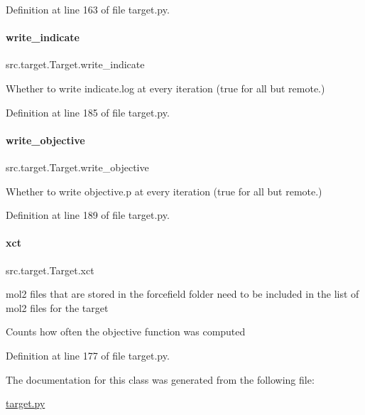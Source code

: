 Definition at line 163 of file target.\+py.

\mbox{\label{classsrc_1_1target_1_1Target_a5ff3607a8c506a55391373efeb7e96e6}} 
\paragraph{\texorpdfstring{write\+\_\+indicate}{write\_indicate}}
{\footnotesize\ttfamily src.\+target.\+Target.\+write\+\_\+indicate}



Whether to write indicate.\+log at every iteration (true for all but remote.) 



Definition at line 185 of file target.\+py.

\mbox{\label{classsrc_1_1target_1_1Target_ac1a22fe6151b536329f6cfb3a9e4b7ee}} 
\paragraph{\texorpdfstring{write\+\_\+objective}{write\_objective}}
{\footnotesize\ttfamily src.\+target.\+Target.\+write\+\_\+objective}



Whether to write objective.\+p at every iteration (true for all but remote.) 



Definition at line 189 of file target.\+py.

\mbox{\label{classsrc_1_1target_1_1Target_a399fd456592279c108753f3694950620}} 
\paragraph{\texorpdfstring{xct}{xct}}
{\footnotesize\ttfamily src.\+target.\+Target.\+xct}



mol2 files that are stored in the forcefield folder need to be included in the list of mol2 files for the target 

Counts how often the objective function was computed 

Definition at line 177 of file target.\+py.



The documentation for this class was generated from the following file\+:\begin{DoxyCompactItemize}
\item 
\hyperlink{target_8py}{target.\+py}\end{DoxyCompactItemize}
